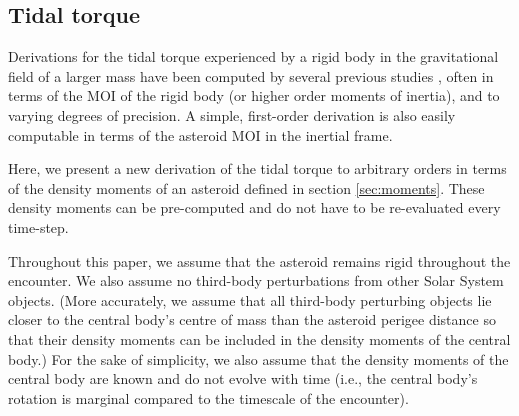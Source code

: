 \subsection{Tidal torque}
\label{sec:tidal-torque}

Derivations for the tidal torque experienced by a rigid body in the gravitational field of a larger mass have been computed by several previous studies \cite{paul88,HouMar2017,BOUE2009750, ashenberg07}, often in terms of the MOI of the rigid body (or higher order moments of inertia), and to varying degrees of precision. A simple, first-order derivation is also easily computable in terms of the asteroid MOI in the inertial frame.

Here, we present a new derivation of the tidal torque to arbitrary orders in terms of the density moments of an asteroid defined in section \ref{sec:moments}. These density moments can be pre-computed and do not have to be re-evaluated every time-step.

Throughout this paper, we assume that the asteroid remains rigid throughout the encounter. We also assume no third-body perturbations from other Solar System objects. (More accurately, we assume that all third-body perturbing objects lie closer to the central body's centre of mass than the asteroid perigee distance so that their density moments can be included in the density moments of the central body.) For the sake of simplicity, we also assume that the density moments of the central body are known and do not evolve with time (i.e., the central body's rotation is marginal compared to the timescale of the encounter).

